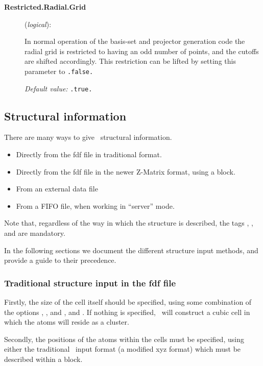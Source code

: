 \begin{description}
\item[\textbf{Restricted.Radial.Grid}] (\textit{logical}):

In normal operation of the basis-set and projector generation code the
radial grid is restricted to having an odd number of points, and the
cutoffs are shifted accordingly. This restriction can be lifted by
setting this parameter to \texttt{.false.}

\textit{Default value:} \texttt{.true.}
\end{description}


\vspace{5pt}
\subsection{Structural information}

There are many ways to give \siesta\ structural information.

\begin{itemize}
\item Directly from the fdf file in traditional format.
\item Directly from the fdf file in the newer Z-Matrix format, using
a  block.
\item From an external data file
\item From a FIFO file, when working in ``server'' mode.
\end{itemize}

Note that, regardless of the way in which the structure is described,
the tags , , and
 are mandatory.

In the following sections we document the different structure input
methods, and provide a guide to their precedence.

\subsubsection{Traditional structure input in the fdf file}

Firstly, the size of the cell itself should be specified, using some
combination of the options ,
, and , and
.  If nothing is specified, \siesta\ will construct a
cubic cell in which the atoms will reside as a cluster.

Secondly, the positions of the atoms within the cells must be
specified, using either the traditional \siesta\ input format (a
modified xyz format) which must be described within a
 block.

